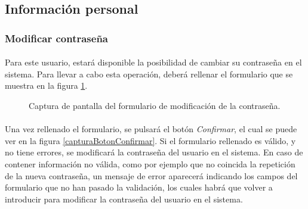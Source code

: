 \subsection{Información personal}

  \subsubsection{Modificar contraseña}

  \paragraph{}Para este usuario, estará disponible la posibilidad de cambiar su
  contraseña en el sistema. Para llevar a cabo esta operación, deberá rellenar
  el formulario que se muestra en la figura
  \ref{capturaPantallaModificarPassword}.

  \begin{figure}[!ht]
    \begin{center}
      \caption{Captura de pantalla del formulario de modificación de la contraseña.}
      \label{capturaPantallaModificarPassword}
    \end{center}
  \end{figure}

  \paragraph{}Una vez rellenado el formulario, se pulsará el botón
  \textit{Confirmar}, el cual se puede ver en la figura
  \ref{capturaBotonConfirmar}. Si el formulario rellenado es válido, y no tiene
  errores, se modificará la contraseña del usuario en el sistema. En caso de
  contener información no válida, como por ejemplo que no coincida la repetición
  de la nueva contraseña, un mensaje de error aparecerá indicando los campos
  del formulario que no han pasado la validación, los cuales habrá que volver
  a introducir para modificar la contraseña del usuario en el sistema.
